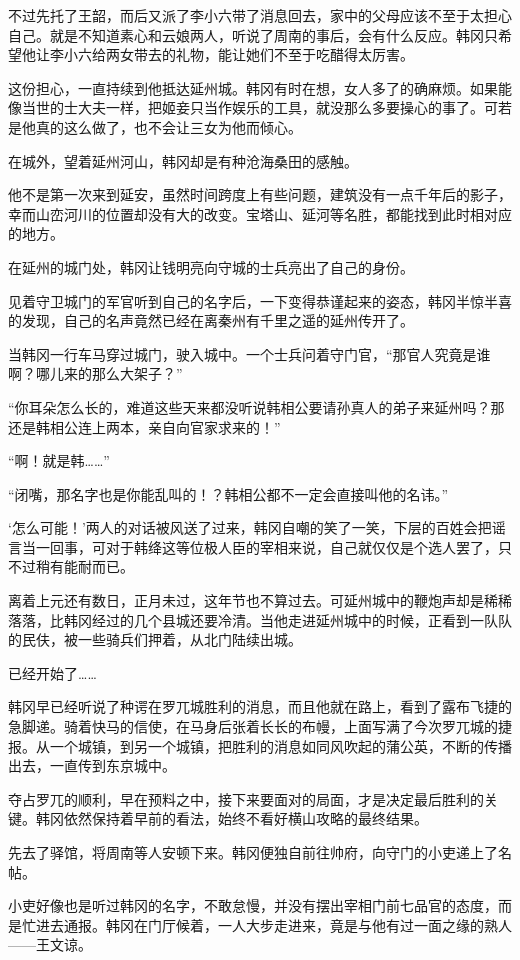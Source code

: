 不过先托了王韶，而后又派了李小六带了消息回去，家中的父母应该不至于太担心自己。就是不知道素心和云娘两人，听说了周南的事后，会有什么反应。韩冈只希望他让李小六给两女带去的礼物，能让她们不至于吃醋得太厉害。

这份担心，一直持续到他抵达延州城。韩冈有时在想，女人多了的确麻烦。如果能像当世的士大夫一样，把姬妾只当作娱乐的工具，就没那么多要操心的事了。可若是他真的这么做了，也不会让三女为他而倾心。

在城外，望着延州河山，韩冈却是有种沧海桑田的感触。

他不是第一次来到延安，虽然时间跨度上有些问题，建筑没有一点千年后的影子，幸而山峦河川的位置却没有大的改变。宝塔山、延河等名胜，都能找到此时相对应的地方。

在延州的城门处，韩冈让钱明亮向守城的士兵亮出了自己的身份。

见着守卫城门的军官听到自己的名字后，一下变得恭谨起来的姿态，韩冈半惊半喜的发现，自己的名声竟然已经在离秦州有千里之遥的延州传开了。

当韩冈一行车马穿过城门，驶入城中。一个士兵问着守门官，“那官人究竟是谁啊？哪儿来的那么大架子？”

“你耳朵怎么长的，难道这些天来都没听说韩相公要请孙真人的弟子来延州吗？那还是韩相公连上两本，亲自向官家求来的！”

“啊！就是韩……”

“闭嘴，那名字也是你能乱叫的！？韩相公都不一定会直接叫他的名讳。”

‘怎么可能！’两人的对话被风送了过来，韩冈自嘲的笑了一笑，下层的百姓会把谣言当一回事，可对于韩绛这等位极人臣的宰相来说，自己就仅仅是个选人罢了，只不过稍有能耐而已。

离着上元还有数日，正月未过，这年节也不算过去。可延州城中的鞭炮声却是稀稀落落，比韩冈经过的几个县城还要冷清。当他走进延州城中的时候，正看到一队队的民伕，被一些骑兵们押着，从北门陆续出城。

已经开始了……

韩冈早已经听说了种谔在罗兀城胜利的消息，而且他就在路上，看到了露布飞捷的急脚递。骑着快马的信使，在马身后张着长长的布幔，上面写满了今次罗兀城的捷报。从一个城镇，到另一个城镇，把胜利的消息如同风吹起的蒲公英，不断的传播出去，一直传到东京城中。

夺占罗兀的顺利，早在预料之中，接下来要面对的局面，才是决定最后胜利的关键。韩冈依然保持着早前的看法，始终不看好横山攻略的最终结果。

先去了驿馆，将周南等人安顿下来。韩冈便独自前往帅府，向守门的小吏递上了名帖。

小吏好像也是听过韩冈的名字，不敢怠慢，并没有摆出宰相门前七品官的态度，而是忙进去通报。韩冈在门厅候着，一人大步走进来，竟是与他有过一面之缘的熟人——王文谅。

